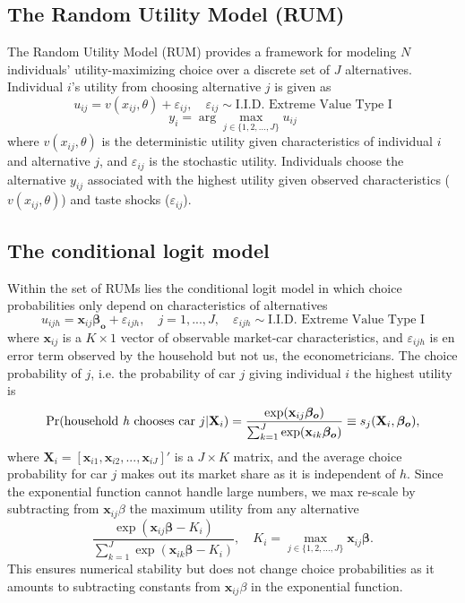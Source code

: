 \documentclass[11pt]{article}
\begin{document}
\subsection{The Random Utility Model (RUM)}
The Random Utility Model (RUM) provides a framework for modeling $N$ individuals' utility-maximizing choice over a discrete set of $J$ alternatives. Individual $i$'s utility from choosing alternative $j$ is given as
\begin{equation}
    u_{ij}=v(x_{ij},\theta)+\varepsilon_{ij}, \quad \varepsilon_{ij}\sim \text{I.I.D. Extreme Value Type I} 
\end{equation}
\begin{equation}
    y_i=\arg \max_{j\in\{1,2,...,J\}}u_{ij}
    \label{eq:argmax_random_utility}
\end{equation}
where $v(x_{ij},\theta)$ is the deterministic utility given characteristics of individual $i$ and alternative $j$, and $\varepsilon_{ij}$ is the stochastic utility. Individuals choose the alternative $y_{ij}$ associated with the highest utility given observed characteristics ($v(x_{ij},\theta)$) and taste shocks ($\varepsilon_{ij}$). 

\subsection{The conditional logit model}
Within the set of RUMs lies the conditional logit model in which choice probabilities only depend on characteristics of alternatives
\begin{equation}
\label{cond_logit}
    u_{ijh} = \mathbf{x}_{ij}\boldsymbol{\beta_o} + \varepsilon_{ijh}, \quad j=1,...,J, \quad \varepsilon_{ijh}\sim \text{I.I.D. Extreme Value Type I} 
\end{equation}
where $\mathbf{x}_{ij}$ is a $K\times1$ vector of observable market-car characteristics, and $\varepsilon_{ijh}$ is en error term observed by the household but not us, the econometricians. 
The choice probability of $j$, i.e. the probability of car $j$ giving individual $i$ the highest utility is 
\begin{equation}
\label{choice_probability}
    \text{Pr}(\text{household \textit{h} chooses car } j|\mathbf{X}_i)=\frac{\exp(\mathbf{x}_{ij}\boldsymbol{\beta_o})}{\sum_{k=1}^J\exp(\mathbf{x}_{ik}\boldsymbol{\beta_o})}\equiv s_j(\mathbf{X}_i,\boldsymbol{\beta_o}),
\end{equation}
where $\mathbf{X}_i=[\mathbf{x}_{i1},\mathbf{x}_{i2},...,\mathbf{x}_{iJ}]'$ is a $J\times K$ matrix, and the average choice probability for car $j$ makes out its market share as it is independent of $h$. 
Since the exponential function cannot handle large numbers, we max re-scale by subtracting from $\mathbf{x}_{ij}\beta$ the maximum utility from any alternative
\begin{equation}
    \frac{\exp(\mathbf{x}_{ij}\boldsymbol{\beta}-K_i)}{\sum_{k=1}^J\exp(\mathbf{x}_{ik}\boldsymbol{\beta}-K_i)}, \quad K_i=\max_{j\in\{1,2,...,J\}}\mathbf{x}_{ij}\boldsymbol{\beta}.
\end{equation}
This ensures numerical stability but does not change choice probabilities as it amounts to subtracting constants from $\mathbf{x}_{ij}\beta$ in the exponential function. 
\end{document}
